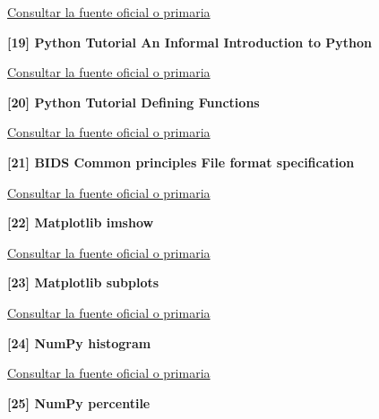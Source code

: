 \href{https://dicom.nema.org/medical/dicom/current/output/chtml/part15/chapter_E.html}{Consultar la fuente oficial o primaria}\par\medskip

\hypertarget{refR19}{}\textbf{[19] Python Tutorial An Informal Introduction to Python}\par

\href{https://docs.python.org/3/tutorial/introduction.html}{Consultar la fuente oficial o primaria}\par\medskip

\hypertarget{refR20}{}\textbf{[20] Python Tutorial Defining Functions}\par

\href{https://docs.python.org/3/tutorial/controlflow.html#defining-functions}{Consultar la fuente oficial o primaria}\par\medskip

\hypertarget{refR21}{}\textbf{[21] BIDS Common principles File format specification}\par

\href{https://bids-specification.readthedocs.io/en/stable/common-principles.html#file-format-specification}{Consultar la fuente oficial o primaria}\par\medskip

\hypertarget{refR22}{}\textbf{[22] Matplotlib imshow}\par

\href{https://matplotlib.org/stable/api/_as_gen/matplotlib.pyplot.imshow.html}{Consultar la fuente oficial o primaria}\par\medskip

\hypertarget{refR23}{}\textbf{[23] Matplotlib subplots}\par

\href{https://matplotlib.org/stable/api/_as_gen/matplotlib.pyplot.subplots.html}{Consultar la fuente oficial o primaria}\par\medskip

\hypertarget{refR24}{}\textbf{[24] NumPy histogram}\par

\href{https://numpy.org/doc/stable/reference/generated/numpy.histogram.html}{Consultar la fuente oficial o primaria}\par\medskip

\hypertarget{refR25}{}\textbf{[25] NumPy percentile}\par

